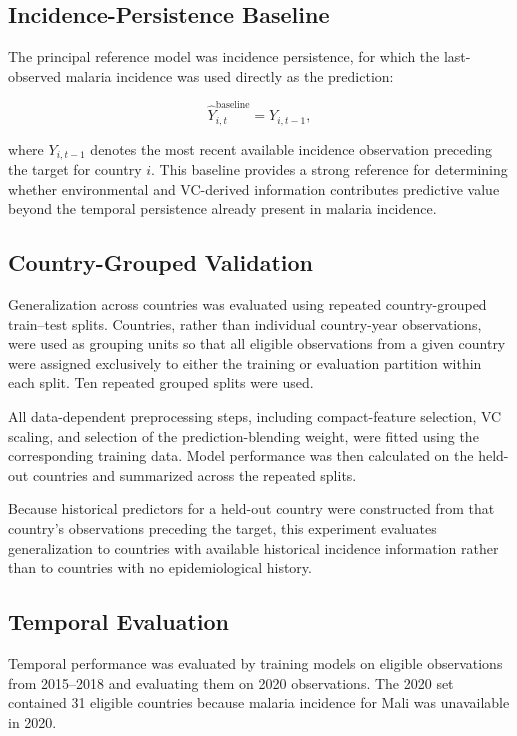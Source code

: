 \documentclass[10pt,twocolumn]{article}
\begin{document}
\subsection{Incidence-Persistence Baseline}

The principal reference model was incidence persistence, for which the
last-observed malaria incidence was used directly as the prediction:

\begin{equation}
\hat{Y}_{i,t}^{\mathrm{baseline}}
=
Y_{i,t-1},
\label{eq:persistence_baseline}
\end{equation}

where \(Y_{i,t-1}\) denotes the most recent available incidence
observation preceding the target for country \(i\). This baseline
provides a strong reference for determining whether environmental and
VC-derived information contributes predictive value beyond the
temporal persistence already present in malaria incidence.


\subsection{Country-Grouped Validation}

Generalization across countries was evaluated using repeated
country-grouped train--test splits. Countries, rather than individual
country-year observations, were used as grouping units so that all
eligible observations from a given country were assigned exclusively
to either the training or evaluation partition within each split. Ten
repeated grouped splits were used.

All data-dependent preprocessing steps, including compact-feature
selection, VC scaling, and selection of the prediction-blending weight,
were fitted using the corresponding training data. Model performance
was then calculated on the held-out countries and summarized across
the repeated splits.

Because historical predictors for a held-out country were constructed
from that country's observations preceding the target, this experiment
evaluates generalization to countries with available historical
incidence information rather than to countries with no epidemiological
history.


\subsection{Temporal Evaluation}

Temporal performance was evaluated by training models on eligible
observations from 2015--2018 and evaluating them on 2020 observations.
The 2020 set contained 31 eligible countries because malaria incidence
for Mali was unavailable in 2020.
\end{document}
